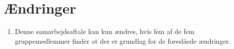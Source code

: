 \section{Ændringer}
\begin{enumerate}
\item{Denne samarbejdsaftale kan kun ændres, hvis fem af de fem gruppemedlemmer finder at der er
grundlag for de foreslåede ændringer.}
\end{enumerate}
